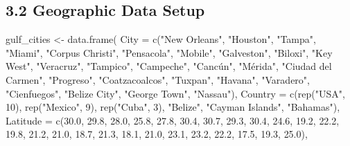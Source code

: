 \documentclass[12pt,letterpaper]{article}
\newenvironment{Shaded}{\begin{snugshade}}{\end{snugshade}}
\newenvironment{Highlighting}{}{}
\newcommand{\DecValTok}[1]{\textcolor[rgb]{0.00,0.00,0.81}{#1}}
\newcommand{\FloatTok}[1]{\textcolor[rgb]{0.00,0.00,0.81}{#1}}
\newcommand{\StringTok}[1]{\textcolor[rgb]{0.31,0.60,0.02}{#1}}
\newcommand{\OtherTok}[1]{\textcolor[rgb]{0.56,0.35,0.01}{#1}}
\newcommand{\FunctionTok}[1]{\textcolor[rgb]{0.00,0.00,0.00}{#1}}
\newcommand{\NormalTok}[1]{#1}
\newcommand{\AttributeTok}[1]{\textcolor[rgb]{0.77,0.63,0.00}{#1}}
\begin{document}
\subsection{3.2 Geographic Data Setup}\label{geographic-data-setup}

\begin{Shaded}
\begin{Highlighting}[]
\NormalTok{gulf\_cities }\OtherTok{\textless{}{-}} \FunctionTok{data.frame}\NormalTok{(}
  \AttributeTok{City =} \FunctionTok{c}\NormalTok{(}\StringTok{"New Orleans"}\NormalTok{, }\StringTok{"Houston"}\NormalTok{, }\StringTok{"Tampa"}\NormalTok{, }\StringTok{"Miami"}\NormalTok{, }\StringTok{"Corpus Christi"}\NormalTok{, }
           \StringTok{"Pensacola"}\NormalTok{, }\StringTok{"Mobile"}\NormalTok{, }\StringTok{"Galveston"}\NormalTok{, }\StringTok{"Biloxi"}\NormalTok{, }\StringTok{"Key West"}\NormalTok{,}
           \StringTok{"Veracruz"}\NormalTok{, }\StringTok{"Tampico"}\NormalTok{, }\StringTok{"Campeche"}\NormalTok{, }\StringTok{"Cancún"}\NormalTok{, }\StringTok{"Mérida"}\NormalTok{,}
           \StringTok{"Ciudad del Carmen"}\NormalTok{, }\StringTok{"Progreso"}\NormalTok{, }\StringTok{"Coatzacoalcos"}\NormalTok{, }\StringTok{"Tuxpan"}\NormalTok{, }\StringTok{"Havana"}\NormalTok{,}
           \StringTok{"Varadero"}\NormalTok{, }\StringTok{"Cienfuegos"}\NormalTok{, }\StringTok{"Belize City"}\NormalTok{, }\StringTok{"George Town"}\NormalTok{, }\StringTok{"Nassau"}\NormalTok{),}
  \AttributeTok{Country =} \FunctionTok{c}\NormalTok{(}\FunctionTok{rep}\NormalTok{(}\StringTok{"USA"}\NormalTok{, }\DecValTok{10}\NormalTok{), }\FunctionTok{rep}\NormalTok{(}\StringTok{"Mexico"}\NormalTok{, }\DecValTok{9}\NormalTok{), }\FunctionTok{rep}\NormalTok{(}\StringTok{"Cuba"}\NormalTok{, }\DecValTok{3}\NormalTok{), }\StringTok{"Belize"}\NormalTok{, }\StringTok{"Cayman Islands"}\NormalTok{, }\StringTok{"Bahamas"}\NormalTok{),}
  \AttributeTok{Latitude =} \FunctionTok{c}\NormalTok{(}\FloatTok{30.0}\NormalTok{, }\FloatTok{29.8}\NormalTok{, }\FloatTok{28.0}\NormalTok{, }\FloatTok{25.8}\NormalTok{, }\FloatTok{27.8}\NormalTok{, }\FloatTok{30.4}\NormalTok{, }\FloatTok{30.7}\NormalTok{, }\FloatTok{29.3}\NormalTok{, }\FloatTok{30.4}\NormalTok{, }\FloatTok{24.6}\NormalTok{,}
               \FloatTok{19.2}\NormalTok{, }\FloatTok{22.2}\NormalTok{, }\FloatTok{19.8}\NormalTok{, }\FloatTok{21.2}\NormalTok{, }\FloatTok{21.0}\NormalTok{, }\FloatTok{18.7}\NormalTok{, }\FloatTok{21.3}\NormalTok{, }\FloatTok{18.1}\NormalTok{, }\FloatTok{21.0}\NormalTok{, }\FloatTok{23.1}\NormalTok{,}
               \FloatTok{23.2}\NormalTok{, }\FloatTok{22.2}\NormalTok{, }\FloatTok{17.5}\NormalTok{, }\FloatTok{19.3}\NormalTok{, }\FloatTok{25.0}\NormalTok{),}

\end{Highlighting}
\end{Shaded}
\end{document}
